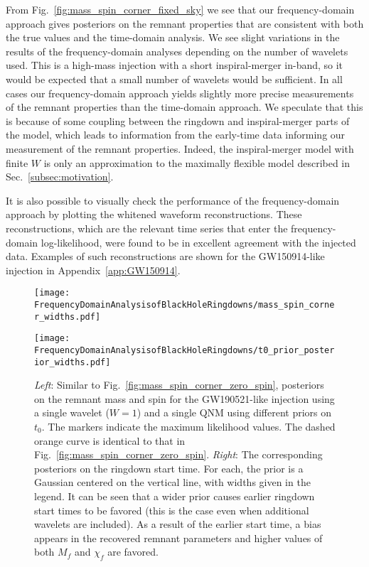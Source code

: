 From Fig.~\ref{fig:mass_spin_corner_fixed_sky} we see that our frequency-domain approach gives posteriors on the remnant properties that are consistent with both the true values and the time-domain analysis.
We see slight variations in the results of the frequency-domain analyses depending on the number of wavelets used.
This is a high-mass injection with a short inspiral-merger in-band, so it would be expected that a small number of wavelets would be sufficient.
In all cases our frequency-domain approach yields slightly more precise measurements of the remnant properties than the time-domain approach.
We speculate that this is because of some coupling between the ringdown and inspiral-merger parts of the model, which leads to information from the early-time data informing our measurement of the remnant properties.
Indeed, the inspiral-merger model with finite $W$ is only an approximation to the maximally flexible model described in Sec.~\ref{subsec:motivation}.

It is also possible to visually check the performance of the frequency-domain approach by plotting the whitened waveform reconstructions.
These reconstructions, which are the relevant time series that enter the frequency-domain log-likelihood, were found to be in excellent agreement with the injected data. 
Examples of such reconstructions are shown for the GW150914-like injection in Appendix~\ref{app:GW150914}.

\begin{figure*}
	\centering
	\begin{minipage}{0.49\linewidth}
		\texttt{[image: FrequencyDomainAnalysisofBlackHoleRingdowns/mass\_spin\_corner\_widths.pdf]}
	\end{minipage}
	\hfill
	\begin{minipage}{0.49\linewidth}
		\vspace{1.2cm}
		\texttt{[image: FrequencyDomainAnalysisofBlackHoleRingdowns/t0\_prior\_posterior\_widths.pdf]} 
	\end{minipage}
	\caption[Similar to Fig.~\ref{fig:mass_spin_corner_zero_spin}, posteriors on the remnant mass and spin for the GW190521-like injection using a single wavelet ($W=1$) and a single QNM using different priors on $t_0$]{ 
		\emph{Left}: Similar to Fig.~\ref{fig:mass_spin_corner_zero_spin}, posteriors on the remnant mass and spin for the GW190521-like injection using a single wavelet ($W=1$) and a single QNM using different priors on $t_0$.
		The markers indicate the maximum likelihood values.
		The dashed orange curve is identical to that in Fig.~\ref{fig:mass_spin_corner_zero_spin}.
		\emph{Right}: The corresponding posteriors on the ringdown start time. For each, the prior is a Gaussian centered on the vertical line, with widths given in the legend.
		It can be seen that a wider prior causes earlier ringdown start times to be favored (this is the case even when additional wavelets are included). As a result of the earlier start time, a bias appears in the recovered remnant parameters and higher values of both $M_f$ and $\chi_f$ are favored.
	}
	\label{fig:start_time_prior}
\end{figure*}

